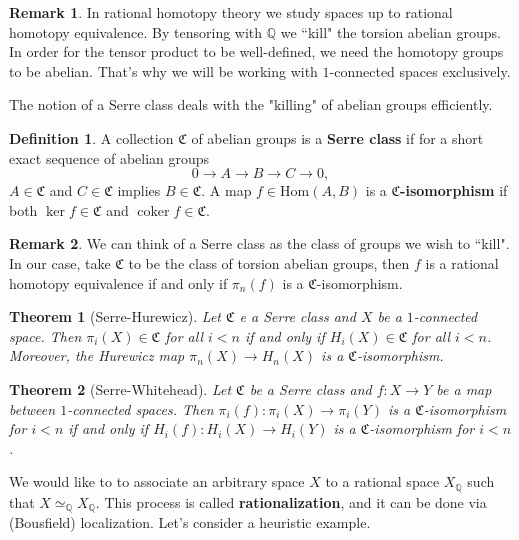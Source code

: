 \documentclass[psamsfonts]{amsart}
\newtheorem{thm}{Theorem}[section]
\theoremstyle{definition}
\newtheorem{defn}{Definition}[section]
\newtheorem{rem}{Remark}[section]
\newcommand{\Q}{\mathbb{Q}}
\newcommand{\Hom}{\mathrm{Hom}}
\DeclareMathOperator{\coker}{coker}
\numberwithin{equation}{section}
\begin{document}
\begin{rem}
In rational homotopy theory we study spaces up to rational homotopy equivalence. By tensoring with $\Q$ we ``kill" the torsion abelian groups. In order for the tensor product to be well-defined, we need the homotopy groups to be abelian. That's why we will be working with $1$-connected spaces exclusively. 
\end{rem}

The notion of a Serre class deals with the "killing" of abelian groups efficiently.

\begin{defn}
A collection $\mathfrak{C}$ of abelian groups is a \textbf{Serre class} if for a short exact sequence of abelian groups
\[0\rightarrow A\to B\to C\to0,\]
$A\in\mathfrak{C}$ and $C\in\mathfrak{C}$ implies $B\in\mathfrak{C}$. A map $f\in\Hom(A,B)$ is a \textbf{$\mathfrak{C}$-isomorphism} if both $\ker f\in\mathfrak{C}$ and $\coker f\in\mathfrak{C}$.
\end{defn}

\begin{rem}
We can think of a Serre class as the class of groups we wish to ``kill". In our case, take $\mathfrak{C}$ to be the class of torsion abelian groups, then $f$ is a rational homotopy equivalence if and only if $\pi_n(f)$ is a $\mathfrak{C}$-isomorphism.
\end{rem}

\begin{thm}[Serre-Hurewicz]
Let $\mathfrak{C}$ e a Serre class and $X$ be a $1$-connected space. Then $\pi_i(X)\in\mathfrak{C}$ for all $i<n$ if and only if $H_i(X)\in\mathfrak{C}$ for all $i<n$. Moreover, the Hurewicz map $\pi_n(X)\to H_n(X)$ is a $\mathfrak{C}$-isomorphism.
\end{thm}

\begin{thm}[Serre-Whitehead]
Let $\mathfrak{C}$ be a Serre class and $f:X\to Y$ be a map between $1$-connected spaces. Then $\pi_i(f):\pi_i(X)\to\pi_i(Y)$ is a $\mathfrak{C}$-isomorphism for $i<n$ if and only if $H_i(f):H_i(X)\to H_i(Y)$ is a $\mathfrak{C}$-isomorphism for $i<n$.
\end{thm}

We would like to to associate an arbitrary space $X$ to a rational space $X_\Q$ such that $X\simeq_\Q X_\Q$. This process is called \textbf{rationalization}, and it can be done via (Bousfield) localization. Let's consider a heuristic example.
\end{document}
